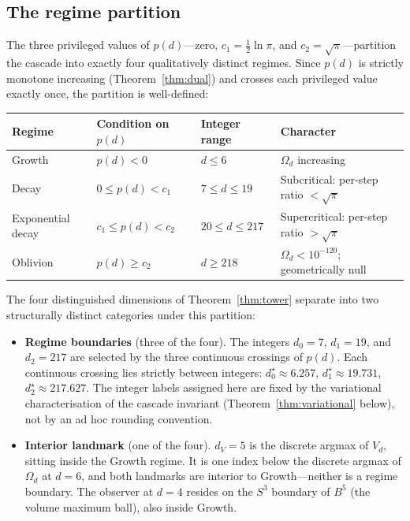 \documentclass[11pt,a4paper]{article}
\begin{document}
\subsection{The regime partition}\label{sec:regimes}

The three privileged values of $p(d)$---zero, $c_1 = \tfrac{1}{2}\ln\pi$,
and $c_2 = \sqrt{\pi}$---partition the cascade into exactly four
qualitatively distinct regimes. Since $p(d)$ is strictly monotone
increasing (Theorem~\ref{thm:dual}) and crosses each privileged value
exactly once, the partition is well-defined:

\begin{center}
\renewcommand{\arraystretch}{1.2}
\begin{tabular}{llll}
\toprule
Regime & Condition on $p(d)$ & Integer range & Character \\
\midrule
Growth & $p(d) < 0$ & $d \leq 6$ & $\Omega_d$ increasing \\
Decay & $0 \leq p(d) < c_1$ & $7 \leq d \leq 19$ &
  Subcritical: per-step ratio $< \sqrt{\pi}$ \\
Exponential decay & $c_1 \leq p(d) < c_2$ & $20 \leq d \leq 217$ &
  Supercritical: per-step ratio $> \sqrt{\pi}$ \\
Oblivion & $p(d) \geq c_2$ & $d \geq 218$ &
  $\Omega_d < 10^{-120}$; geometrically null \\
\bottomrule
\end{tabular}
\end{center}

\noindent The four distinguished dimensions of Theorem~\ref{thm:tower}
separate into two structurally distinct categories under this partition:

\begin{itemize}
\item \textbf{Regime boundaries} (three of the four). The integers
$d_0 = 7$, $d_1 = 19$, and $d_2 = 217$ are selected by the three
continuous crossings of $p(d)$. Each continuous crossing lies strictly
between integers: $d_0^\star \approx 6.257$, $d_1^\star \approx 19.731$,
$d_2^\star \approx 217.627$. The integer labels assigned here are
fixed by the variational characterisation of the cascade invariant
(Theorem~\ref{thm:variational} below), not by an ad hoc rounding
convention.
\item \textbf{Interior landmark} (one of the four). $d_V = 5$ is the
discrete argmax of $V_d$, sitting inside the Growth regime. It is one
index below the discrete argmax of $\Omega_d$ at $d = 6$, and both
landmarks are interior to Growth---neither is a regime boundary. The
observer at $d = 4$ resides on the $S^3$ boundary of $B^5$ (the volume
maximum ball), also inside Growth.
\end{itemize}
\end{document}
